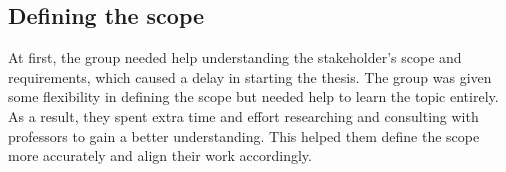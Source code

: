\subsection{Defining the scope}
At first, the group needed help understanding the stakeholder's scope and requirements, which caused a delay in starting the thesis. The group was given some flexibility in defining the scope but needed help to learn the topic entirely. As a result, they spent extra time and effort researching and consulting with professors to gain a better understanding. This helped them define the scope more accurately and align their work accordingly.


